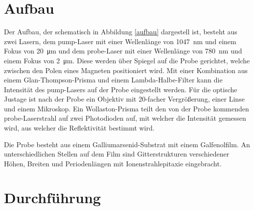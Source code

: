\section{Aufbau}

Der Aufbau, der schematisch in Abbildung \autoref{aufbau} dargestell ist, besteht aus zwei Lasern, dem pump-Laser mit einer Wellenlänge von \SI{1047}{\nano\metre} und einem Fokus von \SI{20}{\micro\metre} und dem probe-Laser mit einer Wellenlänge von \SI{780}{\nano\metre} und einem Fokus von \SI{2}{\micro\metre}. Diese werden über Spiegel auf die Probe gerichtet, welche zwischen den Polen eines Magneten positioniert wird. Mit einer Kombination aus einem Glan-Thompson-Prisma und einem Lambda-Halbe-Filter kann die Intensität des pump-Lasers auf der Probe eingestellt werden. Für die optische Justage ist nach der Probe ein Objektiv mit 20-facher Vergrößerung, einer Linse und einem Mikroskop. Ein Wollaston-Prisma teilt den von der Probe kommenden probe-Laserstrahl auf zwei Photodioden auf, mit welcher  die Intensität gemessen wird, aus welcher die Reflektivität bestimmt wird.

Die Probe besteht aus einem Galliumarsenid-Substrat mit einem Galfenolfilm. An unterschiedlichen Stellen auf dem Film sind Gitterstrukturen verschiedener Höhen,  Breiten und Periodenlängen mit Ionenstrahlepitaxie eingebracht.

\section{Durchf\"{u}hrung}

